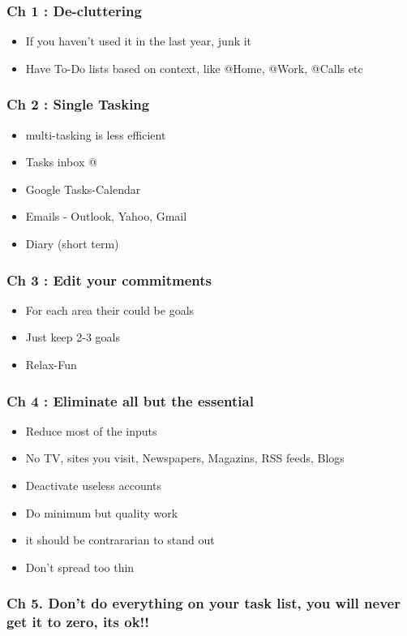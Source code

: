\begin{frame}[fragile]
\frametitle{Ch 1 : De-cluttering}
\begin{itemize}
\item If you haven't used it in the last year, junk it
\item Have To-Do lists based on context, like @Home, @Work, @Calls etc
\end{itemize}
\end{frame}

\begin{frame}[fragile]
\frametitle{Ch 2 : Single Tasking}
\begin{itemize}
\item multi-tasking is less efficient
\item Tasks inbox @
\item Google Tasks-Calendar
\item Emails - Outlook, Yahoo, Gmail
\item Diary (short term)
\end{itemize}
\end{frame}

\begin{frame}[fragile]
\frametitle{Ch 3 : Edit your commitments}
\begin{itemize}
\item For each area their could be goals
\item Just keep 2-3 goals
\item Relax-Fun
\end{itemize}
\end{frame}

\begin{frame}[fragile]
\frametitle{Ch 4 : Eliminate all but the essential}
\begin{itemize}
\item Reduce most of the inputs
\item No TV, sites you visit, Newspapers, Magazins, RSS feeds, Blogs
\item Deactivate useless accounts
\item Do minimum but quality work
\item it should be contrararian to stand out
\item Don't spread too thin
\end{itemize}
\end{frame}

\begin{frame}[fragile]
\frametitle{Ch 5. Don't do everything on your task list, you will never get it to zero, its ok!!}
\end{frame}

